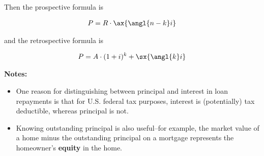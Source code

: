 \documentclass[12pt]{article}
\begin{document}
\begin{flushleft}
    Then the prospective formula is
\end{flushleft}
\vspace{-.3in}

\begin{align*}
    P & = R \cdot \ax{ \angl{n-k} i} \\
\end{align*}
\vspace{-.3in}

\begin{flushleft}
    and the retrospective formula is
\end{flushleft}
\vspace{-.3in}

\begin{align*}
    P & = A \cdot (1+i)^k + \sx{ \angl{k} i} \\
\end{align*}
\vspace{-.2in}

\begin{center}
\end{center}

\begin{flushleft}
    \textbf{Notes:} \\
\end{flushleft}

\begin{itemize}
    \item One reason for distinguishing between principal and interest in loan repayments is that for U.S.
          federal tax purposes, interest is (potentially) tax deductible, whereas principal is not.
    \item Knowing outstanding principal is also useful--for example, the market value of a home minus the
          outstanding principal on a mortgage represents the homeowner's \textbf{equity} in the home.
\end{itemize}
\end{document}
